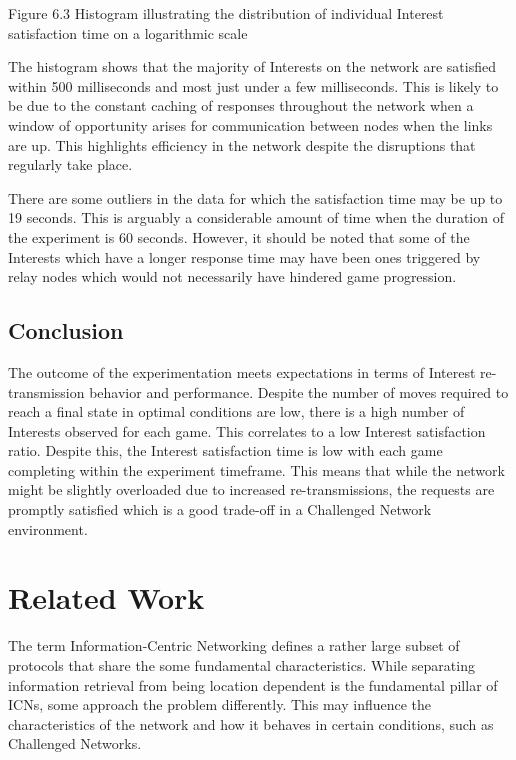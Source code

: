 \documentclass[a4paper,12pt]{report}      %
\begin{document}
\begin{center}Figure 6.3 Histogram illustrating the distribution of individual Interest satisfaction time on a logarithmic scale\end{center}

The histogram shows that the majority of Interests on the network are satisfied within 500 milliseconds
and most just under a few milliseconds. This is likely to be due to the constant caching of responses
throughout the network when a window of opportunity arises for communication between nodes when
the links are up. This highlights efficiency in the network despite the disruptions that regularly take
place.

There are some outliers in the data for which the satisfaction time may be up to 19 seconds. This is
arguably a considerable amount of time when the duration of the experiment is 60 seconds. However, it
should be noted that some of the Interests which have a longer response time may have been ones
triggered by relay nodes which would not necessarily have hindered game progression.

\section{Conclusion}

The outcome of the experimentation meets expectations in terms of Interest re-transmission behavior and performance.
Despite the number of moves required to reach a final state in optimal conditions are low, there is a high number of Interests observed for each game.
This correlates to a low Interest satisfaction ratio. Despite this, the Interest satisfaction time is low with each game completing within the experiment timeframe.
This means that while the network might be slightly overloaded due to increased re-transmissions, the requests are promptly satisfied which is a good trade-off in a Challenged Network environment.

\pagebreak
\chapter{Related Work}

The term Information-Centric Networking defines a rather large subset of protocols that share the some
fundamental characteristics. While separating information retrieval from being location dependent is
the fundamental pillar of ICNs, some approach the problem differently. This may influence the
characteristics of the network and how it behaves in certain conditions, such as Challenged Networks.
\end{document}
